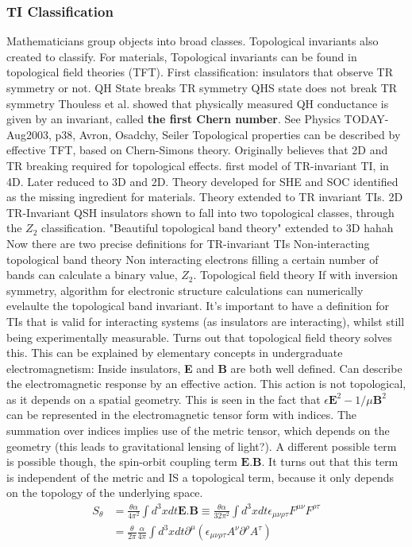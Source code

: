 \documentclass[../mattg_ti-fi_lit-review.tex]{subfiles}
\begin{document}
	\subsubsection{TI Classification}
	\begin{outline}
		\1 Mathematicians group objects into broad classes. Topological invariants also created to classify.
		\1 For materials, Topological invariants can be found in topological field theories (TFT).
		\2 First classification: insulators that observe TR symmetry or not.
		\3 QH State breaks TR symmetry
		\3 QHS state does not break TR symmetry
		\2 Thouless et al. showed that physically measured QH conductance is given by an invariant, called \textbf{the first Chern number}. {See Physics TODAY- Aug2003, p38, Avron, Osadchy, Seiler}
		\2 Topological properties can be described by effective TFT, based on Chern-Simons theory.
		\1 Originally believes that 2D and TR breaking required for topological effects.
		 first model of TR-invariant TI, in 4D.
		\2 Later reduced to 3D and 2D.
		\2 Theory developed for SHE and SOC identified as the missing ingredient for materials.
		\2 Theory extended to TR invariant TIs.
		\2 2D TR-Invariant QSH insulators shown to fall into two topological classes, through the $Z_2$ classification.
		\2 "Beautiful topological band theory" extended to 3D hahah
		\1 Now there are two precise definitions for TR-invariant TIs
		\2 Non-interacting topological band theory
		\3 Non interacting electrons filling a certain number of bands can calculate a binary value, $Z_2$.
		\2 Topological field theory
		\3 If with inversion symmetry, algorithm for electronic structure calculations can numerically evelaulte the topological band invariant.
		\1 It's important to have a definition for TIs that is valid for interacting systems (as insulators are interacting), whilst still being experimentally measurable. Turns out that topological field theory solves this.
		\1 This can be explained by elementary concepts in undergraduate electromagnetism:
		\2 Inside insulators, \textbf{E} and \textbf{B} are both well defined.
		\2 Can describe the electromagnetic response by an effective action.
		\2 This action is not topological, as it depends on a spatial geometry. This is seen in the fact that $\epsilon \textbf{E}^2-1/\mu\textbf{B}^2$ can be represented in the electromagnetic tensor form with indices. The summation over indices implies use of the metric tensor, which depends on the geometry (this leads to gravitational lensing of light?).
		\2 A different possible term is possible though, the spin-orbit coupling term $\textbf{E}.\textbf{B}$. It turns out that this term is independent of the metric and IS a topological term, because it only depends on the topology of the underlying space.
		\begin{align}
		S_\theta &= \frac{\theta\alpha}{4\pi^2}\int d^3xdt \textbf{E.B} \equiv \frac{\theta\alpha}{32\pi^2}\int d^3xdt \epsilon_{\mu\nu\rho\tau}F^{\mu\nu}F^{\rho\tau}\\
		&= \frac{\theta}{2\pi}\frac{\alpha}{4\pi}\int d^3xdt \partial^{\mu}\left(\epsilon_{\mu\nu\rho\tau}A^\nu\partial^\rho A^\tau\right)
		\end{align}
		

\end{outline}
\end{document}
